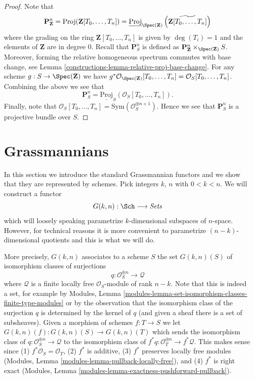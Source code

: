 \begin{proof}

Note that
$$
\mathbf{P}^n_{\mathbf{Z}} =
\text{Proj}(\mathbf{Z}[T_0, \ldots, T_n]) =
\underline{\text{Proj}}_{\Spec(\mathbf{Z})}
\left(\widetilde{\mathbf{Z}[T_0, \ldots, T_n]}\right)
$$
where the grading on the ring $\mathbf{Z}[T_0, \ldots, T_n]$ is given by
$\deg(T_i) = 1$ and the elements of $\mathbf{Z}$ are in degree $0$.
Recall that $\mathbf{P}^n_S$ is defined as
$\mathbf{P}^n_{\mathbf{Z}} \times_{\Spec(\mathbf{Z})} S$.
Moreover, forming the relative homogeneous spectrum commutes with base change,
see Lemma \ref{constructions-lemma-relative-proj-base-change}.
For any scheme $g : S \to \Spec(\mathbf{Z})$ we have
$g^*\mathcal{O}_{\Spec(\mathbf{Z})}[T_0, \ldots, T_n]
= \mathcal{O}_S[T_0, \ldots, T_n]$.
Combining the above we see that
$$
\mathbf{P}^n_S = \underline{\text{Proj}}_S(\mathcal{O}_S[T_0, \ldots, T_n]).
$$
Finally, note that
$\mathcal{O}_S[T_0, \ldots, T_n] = \text{Sym}(\mathcal{O}_S^{\oplus n + 1})$.
Hence we see that $\mathbf{P}^n_S$ is a projective bundle over $S$.
\end{proof}

\section{Grassmannians}
\label{constructions-section-grassmannian}
In this section we introduce the standard Grassmannian functors and
we show that they are represented by schemes. Pick integers $k$, $n$
with $0 < k < n$. We will construct a functor
\begin{equation}
\label{equation-gkn}
G(k, n) : \Sch \longrightarrow \textit{Sets}
\end{equation}
which will loosely speaking parametrize $k$-dimensional subspaces
of $n$-space. However, for technical reasons it is more convenient
to parametrize $(n - k)$-dimensional quotients and this is what we will
do.

\medskip\noindent
More precisely, $G(k, n)$ associates to a scheme $S$ the set $G(k, n)(S)$
of isomorphism classes of surjections
$$
q : \mathcal{O}_S^{\oplus n} \longrightarrow \mathcal{Q}
$$
where $\mathcal{Q}$ is a finite locally free $\mathcal{O}_S$-module
of rank $n - k$. Note that this is indeed a set, for example by
Modules, Lemma \ref{modules-lemma-set-isomorphism-classes-finite-type-modules}
or by the observation that the isomorphism class of the surjection $q$
is determined by the kernel of $q$ (and given a sheaf there is a set
of subsheaves). Given a morphism of schemes $f : T \to S$ we let
$G(k, n)(f) : G(k, n)(S) \to G(k, n)(T)$ which sends the
isomorphism class of $q : \mathcal{O}_S^{\oplus n} \longrightarrow \mathcal{Q}$
to the isomorphism class of
$f^*q : \mathcal{O}_T^{\oplus n} \longrightarrow f^*\mathcal{Q}$.
This makes sense since  (1) $f^*\mathcal{O}_S = \mathcal{O}_T$,
(2) $f^*$ is additive, (3) $f^*$ preserves locally free modules
(Modules, Lemma \ref{modules-lemma-pullback-locally-free}),
and (4) $f^*$ is right exact
(Modules, Lemma \ref{modules-lemma-exactness-pushforward-pullback}).

